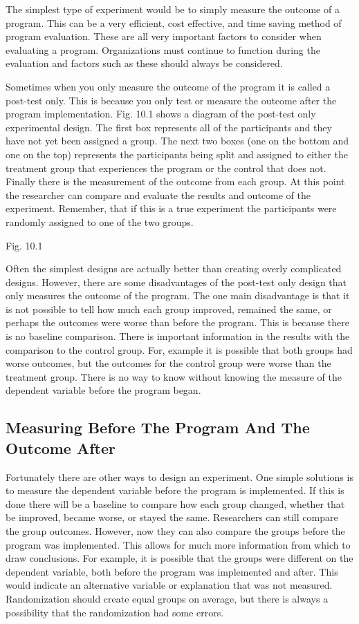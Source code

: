 \documentclass[]{book}
\theoremstyle{definition}
\theoremstyle{definition}
\theoremstyle{definition}
\theoremstyle{remark}
\begin{document}
The simplest type of experiment would be to simply measure the outcome
of a program. This can be a very efficient, cost effective, and time
saving method of program evaluation. These are all very important
factors to consider when evaluating a program. Organizations must
continue to function during the evaluation and factors such as these
should always be considered.

Sometimes when you only measure the outcome of the program it is called
a post-test only. This is because you only test or measure the outcome
after the program implementation. Fig. 10.1 shows a diagram of the
post-test only experimental design. The first box represents all of the
participants and they have not yet been assigned a group. The next two
boxes (one on the bottom and one on the top) represents the participants
being split and assigned to either the treatment group that experiences
the program or the control that does not. Finally there is the
measurement of the outcome from each group. At this point the researcher
can compare and evaluate the results and outcome of the experiment.
Remember, that if this is a true experiment the participants were
randomly assigned to one of the two groups.

Fig. 10.1

Often the simplest designs are actually better than creating overly
complicated designs. However, there are some disadvantages of the
post-test only design that only measures the outcome of the program. The
one main disadvantage is that it is not possible to tell how much each
group improved, remained the same, or perhaps the outcomes were worse
than before the program. This is because there is no baseline
comparison. There is important information in the results with the
comparison to the control group. For, example it is possible that both
groups had worse outcomes, but the outcomes for the control group were
worse than the treatment group. There is no way to know without knowing
the measure of the dependent variable before the program began.

\hypertarget{measuring-before-the-program-and-the-outcome-after}{%
\subsection{Measuring Before The Program And The Outcome
After}\label{measuring-before-the-program-and-the-outcome-after}}

Fortunately there are other ways to design an experiment. One simple
solutions is to measure the dependent variable before the program is
implemented. If this is done there will be a baseline to compare how
each group changed, whether that be improved, became worse, or stayed
the same. Researchers can still compare the group outcomes. However, now
they can also compare the groups before the program was implemented.
This allows for much more information from which to draw conclusions.
For example, it is possible that the groups were different on the
dependent variable, both before the program was implemented and after.
This would indicate an alternative variable or explanation that was not
measured. Randomization should create equal groups on average, but there
is always a possibility that the randomization had some errors.
\end{document}
